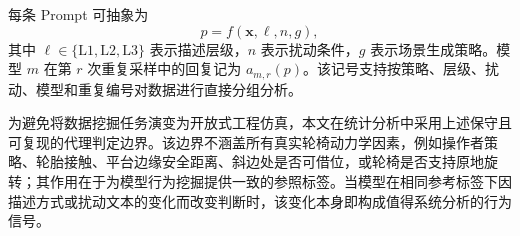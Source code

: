 

每条 Prompt 可抽象为
\begin{equation}
p=f(\mathbf{x},\ell,n,g),
\end{equation}
其中 $\ell\in\{\mathrm{L1},\mathrm{L2},\mathrm{L3}\}$ 表示描述层级，$n$ 表示扰动条件，$g$ 表示场景生成策略。模型 $m$ 在第 $r$ 次重复采样中的回复记为 $a_{m,r}(p)$。该记号支持按策略、层级、扰动、模型和重复编号对数据进行直接分组分析。

为避免将数据挖掘任务演变为开放式工程仿真，本文在统计分析中采用上述保守且可复现的代理判定边界。该边界不涵盖所有真实轮椅动力学因素，例如操作者策略、轮胎接触、平台边缘安全距离、斜边处是否可借位，或轮椅是否支持原地旋转；其作用在于为模型行为挖掘提供一致的参照标签。当模型在相同参考标签下因描述方式或扰动文本的变化而改变判断时，该变化本身即构成值得系统分析的行为信号。
